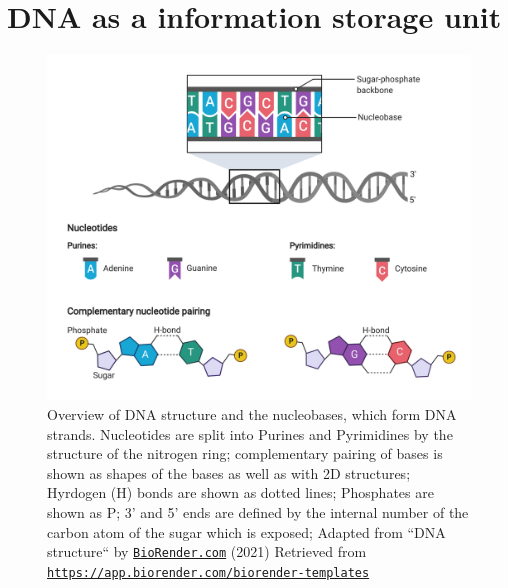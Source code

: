\section[DNA]{DNA as a information storage unit} 
\label{intro-sec:DNA}

\begin{figure}[!ht]
\centering
\includegraphics[width=0.9\linewidth]{Figures/intro/DNAStructure}
\caption[Overview DNA structure]{Overview of DNA structure and the nucleobases, which form DNA strands. Nucleotides are split into Purines and Pyrimidines by the structure of the nitrogen ring; complementary pairing of bases is shown as shapes of the bases as well as with 2D structures; Hyrdogen (H) bonds are shown as dotted lines; Phosphates are shown as P; 3' and 5' ends are defined by the internal number of the carbon atom of the sugar which is exposed; Adapted from ``DNA structure`` by \href{https://biorender.com}{\nolinkurl{BioRender.com}} (2021) Retrieved from \href{https://app.biorender.com/biorender-templates}{\nolinkurl{https://app.biorender.com/biorender-templates}}}\label{fig:DNAstructure}
\end{figure}


